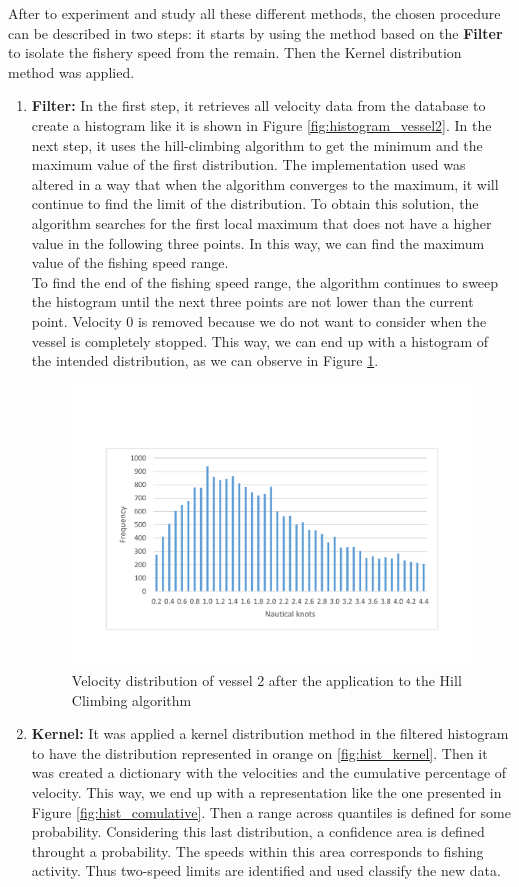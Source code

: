 After to experiment and study all these different methods, the chosen procedure can be described in two steps: it starts by using the method based on the \textbf{Filter} to isolate the fishery speed from the remain. Then the Kernel distribution method was applied.
\begin{enumerate}
\item \textbf{Filter:} In the first step, it retrieves all velocity data from the database to create a histogram like it is shown in Figure \ref{fig:histogram_vessel2}. In the next step, it uses the hill-climbing algorithm to get the minimum and the maximum value of the first distribution. 
The implementation used was altered in a way that when the algorithm converges to the maximum, it will continue to find the limit of the distribution.
To obtain this solution, the algorithm searches for the first local maximum that does not have a higher value in the following three points. In this way, we can find the maximum value of the fishing speed range. \\
To find the end of the fishing speed range, the algorithm continues to sweep the histogram until the next three points are not lower than the current point.
Velocity 0 is removed because we do not want to consider when the vessel is completely stopped. 
This way, we can end up with a histogram of the intended distribution, as we can observe in Figure \ref{fig:sog_hill_climbing}.

\begin{figure}[]
\centering
\includegraphics[trim=0 50 0 50,width=0.8\linewidth]{Chapters/img/sog_hill_climbing.pdf}
\caption{Velocity distribution of vessel 2 after the application to the Hill Climbing algorithm}
\label{fig:sog_hill_climbing}
\end{figure}


\item \textbf{Kernel:} It was applied a kernel distribution method in the filtered histogram to have the distribution represented in orange on \ref{fig:hist_kernel}. Then it was created a dictionary with the velocities and the cumulative percentage of velocity. This way, we end up with a representation like the one presented in Figure \ref{fig:hist_comulative}. 
Then a range across quantiles is defined for some probability. Considering this last distribution, a confidence area is defined throught a probability. The speeds within this area corresponds to fishing activity. Thus two-speed limits are identified and used classify the new data.


\end{enumerate}
